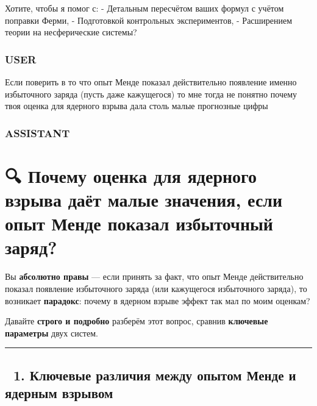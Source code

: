 \documentclass[11pt]{article}
\begin{document}
Хотите, чтобы я помог с: - Детальным пересчётом ваших формул с учётом
поправки Ферми, - Подготовкой контрольных экспериментов, - Расширением
теории на несферические системы?

\subsubsection{USER}\label{user-18}

Если поверить в то что опыт Менде показал действительно появление именно
избыточного заряда (пусть даже кажущегося) то мне тогда не понятно
почему твоя оценка для ядерного взрыва дала столь малые прогнозные цифры

\subsubsection{ASSISTANT}\label{assistant-18}

\section{🔍 Почему оценка для ядерного взрыва даёт малые значения, если
опыт Менде показал избыточный
заряд?}\label{ux43fux43eux447ux435ux43cux443-ux43eux446ux435ux43dux43aux430-ux434ux43bux44f-ux44fux434ux435ux440ux43dux43eux433ux43e-ux432ux437ux440ux44bux432ux430-ux434ux430ux451ux442-ux43cux430ux43bux44bux435-ux437ux43dux430ux447ux435ux43dux438ux44f-ux435ux441ux43bux438-ux43eux43fux44bux442-ux43cux435ux43dux434ux435-ux43fux43eux43aux430ux437ux430ux43b-ux438ux437ux431ux44bux442ux43eux447ux43dux44bux439-ux437ux430ux440ux44fux434}

Вы \textbf{абсолютно правы} --- если принять за факт, что опыт Менде
действительно показал появление избыточного заряда (или кажущегося
избыточного заряда), то возникает \textbf{парадокс}: почему в ядерном
взрыве эффект так мал по моим оценкам?

Давайте \textbf{строго и подробно} разберём этот вопрос, сравнив
\textbf{ключевые параметры} двух систем.

\begin{center}\rule{0.5\linewidth}{\linethickness}\end{center}

\subsection{🔹 1. Ключевые различия между опытом Менде и ядерным
взрывом}\label{ux43aux43bux44eux447ux435ux432ux44bux435-ux440ux430ux437ux43bux438ux447ux438ux44f-ux43cux435ux436ux434ux443-ux43eux43fux44bux442ux43eux43c-ux43cux435ux43dux434ux435-ux438-ux44fux434ux435ux440ux43dux44bux43c-ux432ux437ux440ux44bux432ux43eux43c}
\end{document}
